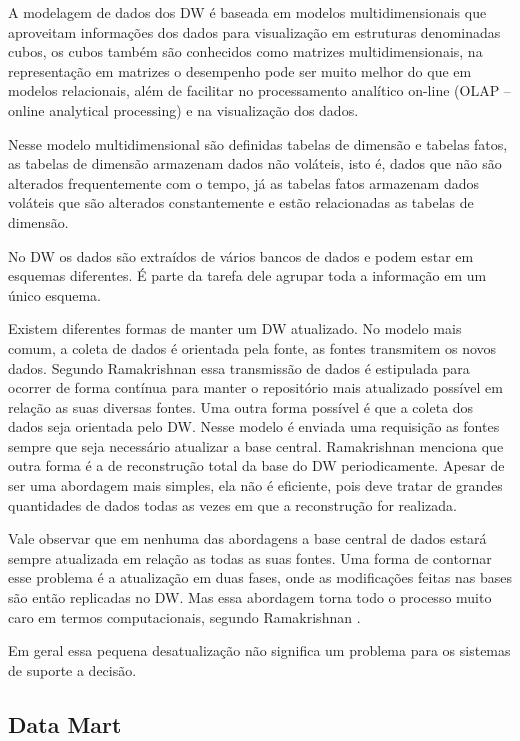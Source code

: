 \documentclass[a4paper,12pt]{article}
\begin{document}
A modelagem de dados dos DW é baseada em modelos multidimensionais que 
aproveitam informações dos dados para visualização em estruturas denominadas
cubos, os cubos também são conhecidos como matrizes multidimensionais, na
representação em matrizes o desempenho pode ser muito melhor do que em modelos
relacionais, além de facilitar no processamento analítico on-line (OLAP – online
analytical processing) e na visualização dos dados.

Nesse modelo multidimensional são definidas tabelas de dimensão e tabelas fatos,
as tabelas de dimensão armazenam dados não voláteis, isto é, dados que não são
alterados frequentemente com o tempo, já as tabelas fatos armazenam dados
voláteis que são alterados constantemente e estão relacionadas as tabelas de
dimensão.

No DW os dados são extraídos de vários bancos de dados e podem estar em 
esquemas diferentes. É parte da tarefa dele agrupar toda a informação em um
único esquema.

Existem diferentes formas de manter um DW atualizado. No modelo mais
comum, a coleta de dados é orientada pela fonte, as fontes transmitem os novos 
dados. Segundo Ramakrishnan \cite{Rama} essa transmissão de dados é estipulada para
ocorrer de forma contínua para manter o repositório mais atualizado possível em
relação as suas diversas fontes. Uma outra forma possível é que a coleta dos
dados seja orientada pelo DW. Nesse modelo é enviada uma requisição as fontes
sempre que seja necessário atualizar a base central. Ramakrishnan \cite{Rama}
menciona que outra forma é a de reconstrução total da base do DW periodicamente.
Apesar de ser uma abordagem mais simples, ela não é eficiente, pois deve tratar
de grandes quantidades de dados todas as vezes em que a reconstrução for realizada.

Vale observar que em nenhuma das abordagens a base central de dados estará 
sempre atualizada em relação as todas as suas fontes. Uma forma de contornar esse
problema é a atualização em duas fases, onde as modificações feitas nas bases 
são então replicadas no DW. Mas essa abordagem torna todo o processo
muito caro em termos computacionais, segundo Ramakrishnan \cite{Rama}.

Em geral essa pequena desatualização não significa um problema para os sistemas
de suporte a decisão.

\subsection{\textbf{Data Mart}}
\end{document}
